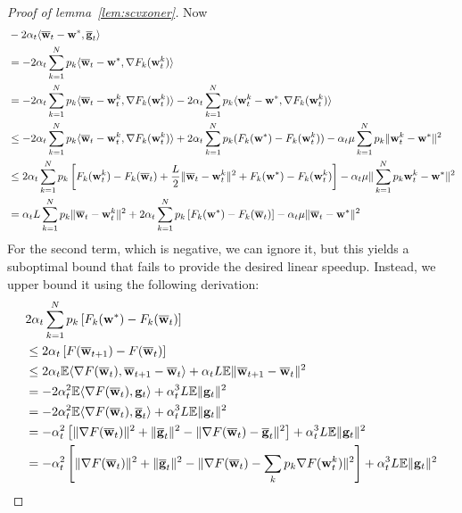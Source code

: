 \begin{proof}[Proof of lemma~\ref{lem:scvxoner}]
	Now 
	\begin{align*}
	& -2\alpha_{t}\langle{\overline{\mathbf{w}}}_{t}-{\mathbf{w}}^{\ast},{\overline{\mathbf{g}}}_{t}\rangle\\
	& =-2\alpha_{t}\sum_{k=1}^{N}p_{k}\langle{\overline{\mathbf{w}}}_{t}-{\mathbf{w}}^{\ast},\nabla F_{k}({\mathbf{w}}_{t}^{k})\rangle\\
	& =-2\alpha_{t}\sum_{k=1}^{N}p_{k}\langle{\overline{\mathbf{w}}}_{t}-{\mathbf{w}}_{t}^{k},\nabla F_{k}({\mathbf{w}}_{t}^{k})\rangle-2\alpha_{t}\sum_{k=1}^{N}p_{k}\langle {\mathbf{w}}_{t}^{k}-{\mathbf{w}}^{\ast},\nabla F_{k}({\mathbf{w}}_{t}^{k})\rangle\\
	& \leq-2\alpha_{t}\sum_{k=1}^{N}p_{k}\langle{\overline{\mathbf{w}}}_{t}-{\mathbf{w}}_{t}^{k},\nabla F_{k}({\mathbf{w}}_{t}^{k})\rangle+2\alpha_{t}\sum_{k=1}^{N}p_{k}(F_{k}({\mathbf{w}}^{\ast})-F_{k}({\mathbf{w}}_{t}^{k}))-\alpha_{t}\mu\sum_{k=1}^{N}p_{k}\|{\mathbf{w}}_{t}^{k}-{\mathbf{w}}^{\ast}\|^{2}\\
	& \leq2\alpha_{t}\sum_{k=1}^{N}p_{k}\left[F_{k}({\mathbf{w}}_{t}^{k})-F_{k}({\overline{\mathbf{w}}}_{t})+\frac{L}{2}\|{\overline{\mathbf{w}}}_{t}-{\mathbf{w}}_{t}^{k}\|^{2}+F_{k}({\mathbf{w}}^{\ast})-F_{k}({\mathbf{w}}_{t}^{k})\right]-\alpha_{t}\mu\|\sum_{k=1}^{N}p_{k}{\mathbf{w}}_{t}^{k}-{\mathbf{w}}^{\ast}\|^{2}\\
	& =\alpha_{t}L\sum_{k=1}^{N}p_{k}\|{\overline{\mathbf{w}}}_{t}-{\mathbf{w}}_{t}^{k}\|^{2}+2\alpha_{t}\sum_{k=1}^{N}p_{k}\left[F_{k}({\mathbf{w}}^{\ast})-F_{k}({\overline{\mathbf{w}}}_{t})\right]-\alpha_{t}\mu\|{\overline{\mathbf{w}}}_{t}-{\mathbf{w}}^{\ast}\|^{2}
	\end{align*}
	For the second term, which is negative, we can ignore it, but this
	yields a suboptimal bound that fails to provide the desired linear
	speedup. Instead, we upper bound it using the following derivation:
	\begin{align*}
	& 2\alpha_{t}\sum_{k=1}^{N}p_{k}\left[F_{k}(\vw^{\ast})-F_{k}(\ov{w}_{t})\right]\\
	& \leq2\alpha_{t}\left[F(\ov{w}_{t+1})-F(\ov{w}_{t})\right]\\
	& \leq2\alpha_{t}\mathbb{E}\langle\nabla F(\ov{w}_{t}),\ov{w}_{t+1}-\ov{w}_{t}\rangle+\alpha_{t}L\mathbb{E}\|\ov{w}_{t+1}-\ov{w}_{t}\|^{2}\\
	& =-2\alpha_{t}^{2}\mathbb{E}\langle\nabla F(\ov{w}_{t}),\vg_{t}\rangle+\alpha_{t}^{3}L\mathbb{E}\|\vg_{t}\|^{2}\\
	& =-2\alpha_{t}^{2}\mathbb{E}\langle\nabla F(\ov{w}_{t}),\ov{g}_{t}\rangle+\alpha_{t}^{3}L\mathbb{E}\|\vg_{t}\|^{2}\\
	& =-\alpha_{t}^{2}\left[\|\nabla F(\ov{w}_{t})\|^{2}+\|\ov{g}_{t}\|^{2}-\|\nabla F(\ov{w}_{t})-\ov{g}_{t}\|^{2}\right]+\alpha_{t}^{3}L\mathbb{E}\|\vg_{t}\|^{2}\\
	& =-\alpha_{t}^{2}\left[\|\nabla F(\ov{w}_{t})\|^{2}+\|\ov{g}_{t}\|^{2}-\|\nabla F(\ov{w}_{t})-\sum_{k}p_{k}\nabla F(\vw_{t}^{k})\|^{2}\right]+\alpha_{t}^{3}L\mathbb{E}\|\vg_{t}\|^{2}\\

\end{align*}
\end{proof}
